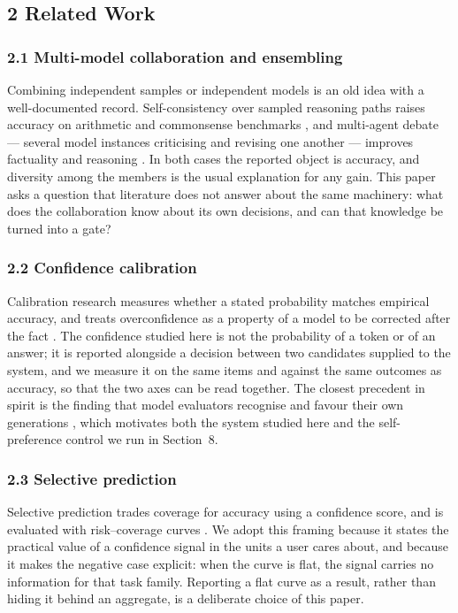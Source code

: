 \documentclass[
]{article}
\begin{document}
\subsection{2 Related Work}\label{related-work}

\subsubsection{2.1 Multi-model collaboration and ensembling}\label{ensembles}

Combining independent samples or independent models is an old idea with a well-documented
record. Self-consistency over sampled reasoning paths raises accuracy on arithmetic and
commonsense benchmarks \cite{wang2022selfconsistency}, and multi-agent debate --- several
model instances criticising and revising one another --- improves factuality and reasoning
\cite{du2023debate}. In both cases the reported object is accuracy, and diversity among
the members is the usual explanation for any gain. This paper asks a question that
literature does not answer about the same machinery: what does the collaboration know
about its own decisions, and can that knowledge be turned into a gate?

\subsubsection{2.2 Confidence calibration}\label{calibration}

Calibration research measures whether a stated probability matches empirical accuracy, and
treats overconfidence as a property of a model to be corrected after the fact
\cite{guo2017calibration}. The confidence studied here is not the probability of a token
or of an answer; it is reported alongside a decision between two candidates supplied to
the system, and we measure it on the same items and against the same outcomes as accuracy,
so that the two axes can be read together. The closest precedent in spirit is the finding that model
evaluators recognise and favour their own generations \cite{panickssery2024selfpreference},
which motivates both the system studied here and the self-preference control
we run in Section~8.

\subsubsection{2.3 Selective prediction}\label{selective}

Selective prediction trades coverage for accuracy using a confidence score, and is
evaluated with risk--coverage curves \cite{geifman2017selective}. We adopt this framing
because it states the practical value of a confidence signal in the units a user cares
about, and because it makes the negative case explicit: when the curve is flat, the signal
carries no information for that task family. Reporting a flat curve as a result, rather
than hiding it behind an aggregate, is a deliberate choice of this paper.
\end{document}

